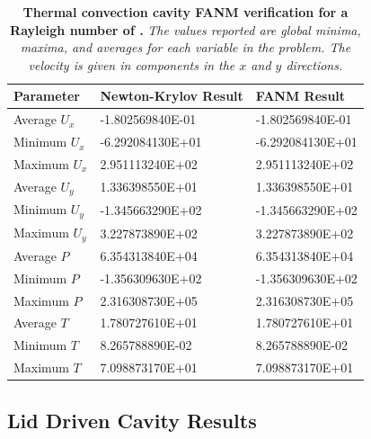 \begin{table}[h!]
  \begin{center}
    \begin{tabular}{lll}\hline\hline
      \multicolumn{1}{l}{Parameter}& 
      \multicolumn{1}{l}{Newton-Krylov Result}&
      \multicolumn{1}{l}{FANM Result}\\
      \hline
      Average $U_x$ & -1.802569840E-01 & -1.802569840E-01 \\
      Minimum $U_x$ & -6.292084130E+01 & -6.292084130E+01 \\
      Maximum $U_x$ & 2.951113240E+02 & 2.951113240E+02 \\
      \hline
      Average $U_y$ & 1.336398550E+01 & 1.336398550E+01 \\
      Minimum $U_y$ & -1.345663290E+02 & -1.345663290E+02 \\
      Maximum $U_y$ & 3.227873890E+02 & 3.227873890E+02 \\
      \hline
      Average $P$ & 6.354313840E+04 & 6.354313840E+04 \\
      Minimum $P$ & -1.356309630E+02 & -1.356309630E+02 \\
      Maximum $P$ & 2.316308730E+05 & 2.316308730E+05 \\
      \hline
      Average $T$ & 1.780727610E+01 & 1.780727610E+01 \\
      Minimum $T$ & 8.265788890E-02 & 8.265788890E-02 \\
      Maximum $T$ & 7.098873170E+01 & 7.098873170E+01 \\
      \hline\hline
    \end{tabular}
  \end{center}
  \caption{\textbf{Thermal convection cavity FANM verification for a
      Rayleigh number of .} \textit{The values reported are
      global minima, maxima, and averages for each variable in the
      problem. The velocity is given in components in the $x$ and $y$
      directions.}}
  \label{tab:convection_ra1e6_results}
\end{table}

\clearpage

\subsection{Lid Driven Cavity Results}
\label{subsec:lid_driven_verification}

